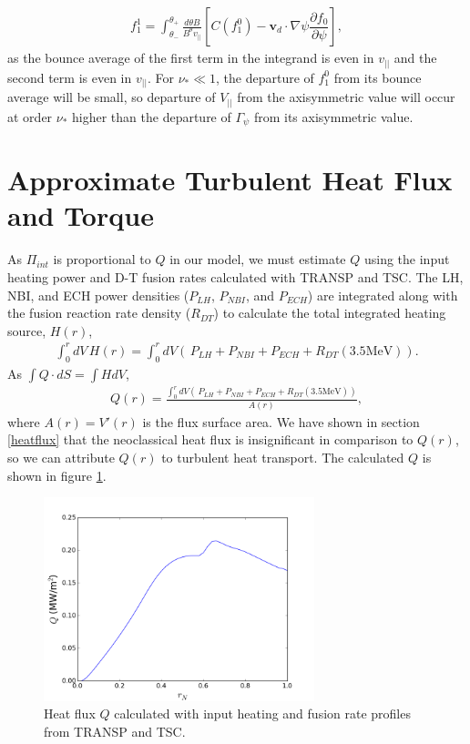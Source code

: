 \documentclass{article}
\numberwithin{figure}{section}
\numberwithin{equation}{section}
\newcommand{\partder}[2]{\dfrac{\partial  #1}{\partial  #2}} %
\begin{document}
\begin{gather}
f_{1}^1 = \int_{\theta_-}^{\theta_+} \frac{d \theta B}{B^{\theta} v_{||}} \left[C(f_1^0) - \bm{v}_d \cdot \nabla \psi \partder{f_0}{\psi} \right],
\end{gather}
as the bounce average of the first term in the integrand is even in $v_{||}$ and the second term is even in $v_{||}$.
For $\nu_* \ll 1$, the departure of $f_1^0$ from its bounce average will be small, so departure of $V_{||}$ from the axisymmetric value will occur at order $\nu_*$ higher than the departure of $\Gamma_{\psi}$ from its axisymmetric value.

\section{Approximate Turbulent Heat Flux and Torque}\label{turbQ}

As $\Pi_{int}$ is proportional to $Q$ in our model, we must estimate $Q$ using the input heating power and D-T fusion rates calculated with TRANSP and TSC. The LH, NBI, and ECH power densities ($P_{LH}$, $P_{NBI}$, and $P_{ECH}$) are integrated along with the fusion reaction rate density ($R_{DT}$) to calculate the total integrated heating source, $H(r)$,
\begin{gather}
\int_0^r dV \, H(r) = \int_0^r dV \left(\, P_{LH} + P_{NBI} + P_{ECH} + R_{DT} (3.5 \text{MeV}) \right).
\end{gather}
As $\int Q \cdot dS = \int H dV$, 
\begin{gather}
Q(r) = \frac{\int_0^r dV \left(\, P_{LH} + P_{NBI} + P_{ECH} + R_{DT} (3.5 \text{MeV}) \right)}{A(r)},
\end{gather}
where $A(r) = V'(r)$ is the flux surface area. We have shown in section \ref{heatflux} that the neoclassical heat flux is insignificant in comparison to $Q(r)$, so we can attribute $Q(r)$ to turbulent heat transport. The calculated $Q$ is shown in figure \ref{fig:turbHeatFlux}.

\begin{figure}[h!]
\centering
\includegraphics[width=0.7\textwidth]{turbHeatFlux.png}
\caption{\label{fig:turbHeatFlux} Heat flux $Q$ calculated with input heating and fusion rate profiles from TRANSP and TSC.}
\end{figure}
\end{document}
